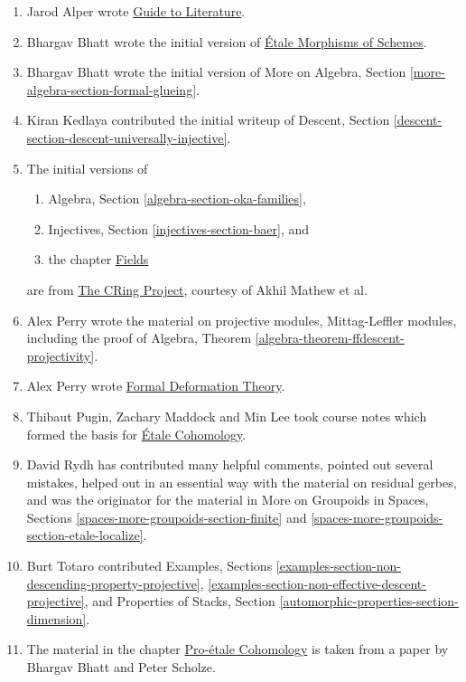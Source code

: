 \begin{enumerate}
\item Jarod Alper wrote
\hyperref[guide-section-phantom]{Guide to Literature}.
\item Bhargav Bhatt wrote the initial version of
\hyperref[etale-section-phantom]{\'Etale Morphisms of Schemes}.
\item Bhargav Bhatt wrote the initial version of
More on Algebra, Section \ref{more-algebra-section-formal-glueing}.
\item Kiran Kedlaya contributed the initial writeup of
Descent, Section \ref{descent-section-descent-universally-injective}.
\item The initial versions of
\begin{enumerate}
\item Algebra, Section \ref{algebra-section-oka-families},
\item Injectives, Section \ref{injectives-section-baer}, and
\item the chapter \hyperref[fields-section-phantom]{Fields}
\end{enumerate}
are from
\href{http://people.fas.harvard.edu/~amathew/cr.html}{The CRing Project},
courtesy of Akhil Mathew et al.
\item Alex Perry wrote the material on projective modules,
Mittag-Leffler modules, including the proof of
Algebra, Theorem \ref{algebra-theorem-ffdescent-projectivity}.
\item Alex Perry wrote
\hyperref[formal-defos-section-phantom]{Formal Deformation Theory}.
\item Thibaut Pugin, Zachary Maddock and Min Lee took course notes
which formed the basis for
\hyperref[etale-cohomology-section-phantom]{\'Etale Cohomology}.
\item David Rydh has contributed many helpful comments, pointed out several
mistakes, helped out in an essential way with the material on residual gerbes,
and was the originator for the material in
More on Groupoids in Spaces, Sections
\ref{spaces-more-groupoids-section-finite} and
\ref{spaces-more-groupoids-section-etale-localize}.
\item Burt Totaro contributed Examples, Sections
\ref{examples-section-non-descending-property-projective},
\ref{examples-section-non-effective-descent-projective},
and
Properties of Stacks, Section \ref{automorphic-properties-section-dimension}.
\item The material in the chapter
\hyperref[proetale-section-phantom]{Pro-\'etale Cohomology}
is taken from a paper by Bhargav Bhatt and Peter Scholze.

\end{enumerate}

